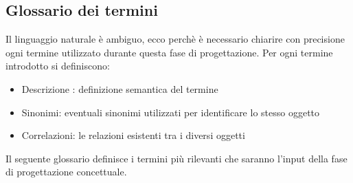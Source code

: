 \documentclass[legalpaper]{article}
\begin{document}
\subsection{Glossario dei termini}
Il linguaggio naturale è ambiguo, ecco perchè è necessario chiarire con precisione ogni termine utilizzato durante questa fase di progettazione.
Per ogni termine introdotto si definiscono:
\begin{itemize}
    \item Descrizione : definizione semantica del termine
    \item Sinonimi: eventuali sinonimi utilizzati per identificare lo stesso oggetto
    \item Correlazioni: le relazioni esistenti tra i diversi oggetti
\end{itemize}
\medskip
Il seguente glossario definisce i termini più rilevanti che saranno l’input della fase di progettazione concettuale.
\medskip
\end{document}
